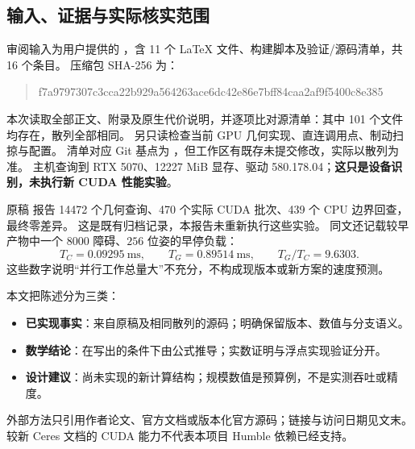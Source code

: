 \subsection{输入、证据与实际核实范围}
审阅输入为用户提供的 ，含 11 个 \LaTeX{} 文件、构建脚本及验证/源码清单，共 16 个条目。
压缩包 SHA-256 为：
\begin{quote}\small\ttfamily
f7a9797307c3cca22b929a564263ace6dc42e86e7bff84caa2af9f5400c8e385
\end{quote}
本次读取全部正文、附录及原生代价说明，并逐项比对源清单：其中 101 个文件均存在，散列全部相同。
另只读检查当前 GPU 几何实现、直连调用点、制动扫掠与配置。
清单对应 Git 基点为 ，但工作区有既存未提交修改，实际以散列为准。
主机查询到 RTX 5070、12227 MiB 显存、驱动 580.178.04；\textbf{这只是设备识别，未执行新 CUDA 性能实验}。

原稿  报告 14472 个几何查询、470 个实际 CUDA 批次、439 个 CPU 边界回查，最终零差异。
这是既有归档记录，本报告未重新执行这些实验。
同文还记载较早产物中一个 $8000$ 障碍、$256$ 位姿的早停负载：
\[
T_C=0.09295\ \mathrm{ms},\qquad T_G=0.89514\ \mathrm{ms},\qquad
T_G/T_C=9.6303.
\]
这些数字说明“并行工作总量大”不充分，不构成现版本或新方案的速度预测。

本文把陈述分为三类：
\begin{itemize}
\item \textbf{已实现事实}：来自原稿及相同散列的源码；明确保留版本、数值与分支语义。
\item \textbf{数学结论}：在写出的条件下由公式推导；实数证明与浮点实现验证分开。
\item \textbf{设计建议}：尚未实现的新计算结构；规模数值是预算例，不是实测吞吐或精度。
\end{itemize}
外部方法只引用作者论文、官方文档或版本化官方源码；链接与访问日期见文末。
较新 Ceres 文档的 CUDA 能力不代表本项目 Humble 依赖已经支持。


